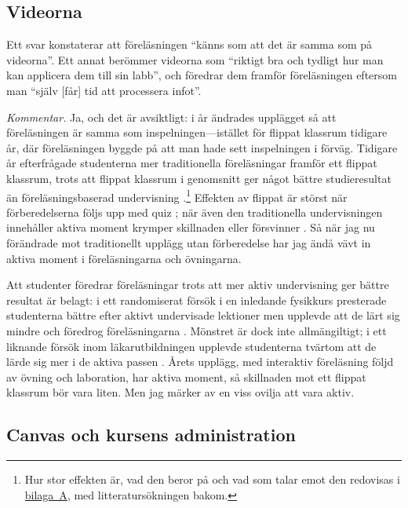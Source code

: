 \documentclass[a4paper]{article}
\begin{document}
\begin{refsection}
\subsection{Videorna}\label{sec:videorna}

Ett svar konstaterar att föreläsningen \enquote{känns som att det är
samma som på videorna}. Ett annat berömmer videorna som \enquote{riktigt
bra och tydligt hur man kan applicera dem till sin labb}, och föredrar
dem framför föreläsningen eftersom man \enquote{själv [får] tid att
processera infot}.

\emph{Kommentar.} Ja, och det är avsiktligt: i år ändrades upplägget så
att föreläsningen är samma som inspelningen---istället för flippat klassrum 
tidigare år, där föreläsningen byggde på att man hade sett inspelningen i 
förväg.
Tidigare år efterfrågade studenterna mer traditionella föreläsningar
framför ett flippat klassrum, trots att flippat klassrum i genomsnitt ger
något bättre studieresultat än föreläsningsbaserad undervisning
\parencite{LagSaele2019,vanAlten2019}.\footnote{Hur stor effekten är, vad
den beror på och vad som talar emot den redovisas i
\hyperref[app:flippat]{bilaga~A}, med litteratursökningen bakom.}
Effekten av flippat är störst när förberedelserna följs upp med quiz 
\parencite{vanAlten2019};
när även den traditionella undervisningen innehåller aktiva moment krymper 
skillnaden eller försvinner \parencite{Jensen2015,Kapur2022}.
Så när jag nu förändrade mot traditionellt upplägg utan förberedelse har jag 
ändå vävt in aktiva moment i föreläsningarna och övningarna.

Att studenter föredrar föreläsningar trots att mer aktiv undervisning ger
bättre resultat är belagt: i ett randomiserat försök i en inledande
fysikkurs presterade studenterna bättre efter aktivt undervisade lektioner
men upplevde att de lärt sig mindre och föredrog föreläsningarna
\parencite{Deslauriers2019}. Mönstret är dock inte allmängiltigt; i ett
liknande försök inom läkarutbildningen upplevde studenterna tvärtom att de
lärde sig mer i de aktiva passen \parencite{Boedeker2025}. Årets upplägg,
med interaktiv föreläsning följd av övning och laboration, har aktiva moment,
så skillnaden mot ett flippat klassrum bör vara liten.
Men jag märker av en viss ovilja att vara aktiv.

\subsection{Canvas och kursens administration}


\end{refsection}
\end{document}
